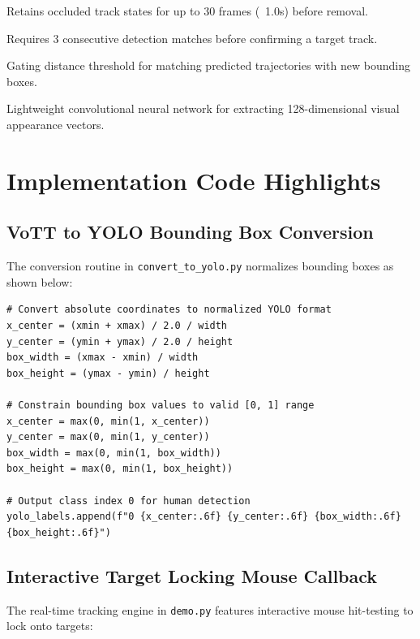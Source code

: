 \documentclass[11pt,a4paper]{article}
\begin{document}
\begin{description}[style=nextline]
    \item[\texttt{max\_age = 30}] Retains occluded track states for up to 30 frames (~1.0s) before removal.
    \item[\texttt{n\_init = 3}] Requires 3 consecutive detection matches before confirming a target track.
    \item[\texttt{max\_iou\_distance = 0.7}] Gating distance threshold for matching predicted trajectories with new bounding boxes.
    \item[\texttt{embedder = 'mobilenet'}] Lightweight convolutional neural network for extracting 128-dimensional visual appearance vectors.
\end{description}

\newpage

\section{Implementation Code Highlights}

\subsection{VoTT to YOLO Bounding Box Conversion}
The conversion routine in \texttt{convert\_to\_yolo.py} normalizes bounding boxes as shown below:

\begin{lstlisting}[caption={Dataset Normalization Snippet (\texttt{convert\_to\_yolo.py})}]
# Convert absolute coordinates to normalized YOLO format
x_center = (xmin + xmax) / 2.0 / width
y_center = (ymin + ymax) / 2.0 / height
box_width = (xmax - xmin) / width
box_height = (ymax - ymin) / height

# Constrain bounding box values to valid [0, 1] range
x_center = max(0, min(1, x_center))
y_center = max(0, min(1, y_center))
box_width = max(0, min(1, box_width))
box_height = max(0, min(1, box_height))

# Output class index 0 for human detection
yolo_labels.append(f"0 {x_center:.6f} {y_center:.6f} {box_width:.6f} {box_height:.6f}")
\end{lstlisting}

\subsection{Interactive Target Locking Mouse Callback}
The real-time tracking engine in \texttt{demo.py} features interactive mouse hit-testing to lock onto targets:
\end{document}
